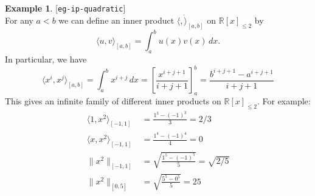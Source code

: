 \documentclass{amsart}
\newcommand{\lbl}[1]{\label{#1}\textup{[\texttt{#1}]}\ \\}
\newcommand{\lbl}{\label}
\newcommand{\R}         {{\mathbb{R}}}
\newcommand{\ip}[1]     {\langle #1\rangle}
\renewcommand{\:}       {\colon}
\theoremstyle{definition}
\newtheorem{example}[theorem]{Example}
\begin{document}
\begin{example}\lbl{eg-ip-quadratic}
 For any $a<b$ we can define an inner product
 $\ip{\dot,\dot}_{[a,b]}$ on $\R[x]_{\leq 2}$ by
 \[ \ip{u,v}_{[a,b]} = \int_a^b u(x)v(x)\,dx. \]
 {In particular, we have 
 \[ \ip{x^i,x^j}_{[a,b]} = \int_a^b x^{i+j}\,dx 
     {= \left[\frac{x^{i+j+1}}{i+j+1}\right]_a^b}
     {= \frac{b^{i+j+1} - a^{i+j+1}}{i+j+1}}
 \]}
 {This gives an infinite family of different inner products
 on $\R[x]_{\leq 2}$. For example:}
 \begin{align*}
  {\ip{1,x^2}_{[-1,1]}} &{= \frac{1^3-(-1)^3}{3} = 2/3} \\
  {\ip{x,x^2}_{[-1,1]}} &{= \frac{1^4-(-1)^4}{4} = 0} \\
  {\|x^2\|_{[-1,1]}} &{= \sqrt{\frac{1^5-(-1)^5}{5}} =  \sqrt{2/5}}\\
  {\|x^2\|_{[0,5]}} &{= \sqrt{\frac{5^5-0^5}{5}} = 25}
 \end{align*}
\end{example}
\end{document}
